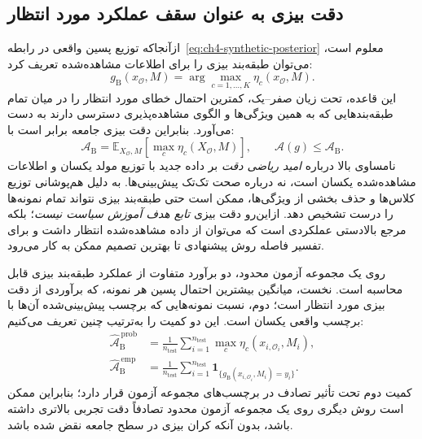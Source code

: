 \subsection{دقت بیزی به عنوان سقف عملکرد مورد انتظار}
\label{subsec:ch4-bayes-ceiling}
ازآنجاکه توزیع پسین واقعی در رابطه~\eqref{eq:ch4-synthetic-posterior} معلوم است، می‌توان طبقه‌بند بیزی را برای اطلاعات مشاهده‌شده تعریف کرد:
\begin{equation}\label{eq:ch4-bayes-rule}
g_{\mathrm B}(x_{\mathcal O},M)
=\arg\max_{c=1,\ldots,K}\eta_c(x_{\mathcal O},M).
\end{equation}
این قاعده، تحت زیان صفر--یک، کمترین احتمال خطای مورد انتظار را در میان تمام طبقه‌بندهایی که به همین ویژگی‌ها و الگوی مشاهده‌پذیری دسترسی دارند به دست می‌آورد. بنابراین دقت بیزی جامعه برابر است با:
\begin{equation}\label{eq:ch4-bayes-accuracy}
\boxed{
\mathcal A_{\mathrm B}
=\mathbb E_{X_{\mathcal O},M}
\left[\max_{c}\eta_c(X_{\mathcal O},M)\right],
\qquad
\mathcal A(g)\le\mathcal A_{\mathrm B}.
}
\end{equation}
نامساوی بالا درباره \emph{امید ریاضی دقت} بر داده جدید با توزیع مولد یکسان و اطلاعات مشاهده‌شده یکسان است، نه درباره صحت تک‌تک پیش‌بینی‌ها. به دلیل هم‌پوشانی توزیع کلاس‌ها و حذف بخشی از ویژگی‌ها، ممکن است حتی طبقه‌بند بیزی نتواند تمام نمونه‌ها را درست تشخیص دهد. ازاین‌رو دقت بیزی \emph{تابع هدف آموزش سیاست نیست}؛ بلکه مرجع بالادستی عملکردی است که می‌توان از داده مشاهده‌شده انتظار داشت و برای تفسیر فاصله روش پیشنهادی تا بهترین تصمیم ممکن به کار می‌رود.

روی یک مجموعه آزمون محدود، دو برآورد متفاوت از عملکرد طبقه‌بند بیزی قابل محاسبه است. نخست، میانگین بیشترین احتمال پسین هر نمونه، که برآوردی از دقت بیزی مورد انتظار است؛ دوم، نسبت نمونه‌هایی که برچسب پیش‌بینی‌شده آن‌ها با برچسب واقعی یکسان است. این دو کمیت را به‌ترتیب چنین تعریف می‌کنیم:
\begin{equation}\label{eq:ch4-bayes-test-estimates}
\begin{aligned}
\widehat{\mathcal A}_{\mathrm B}^{\,\mathrm{prob}}
&=\frac{1}{n_{\mathrm{test}}}
\sum_{i=1}^{n_{\mathrm{test}}}
\max_c\eta_c(x_{i,\mathcal O_i},M_i),\\
\widehat{\mathcal A}_{\mathrm B}^{\,\mathrm{emp}}
&=\frac{1}{n_{\mathrm{test}}}
\sum_{i=1}^{n_{\mathrm{test}}}
\mathbf1_{\{g_{\mathrm B}(x_{i,\mathcal O_i},M_i)=y_i\}}.
\end{aligned}
\end{equation}
کمیت دوم تحت تأثیر تصادف در برچسب‌های مجموعه آزمون قرار دارد؛ بنابراین ممکن است روش دیگری روی یک مجموعه آزمون محدود تصادفاً دقت تجربی بالاتری داشته باشد، بدون آنکه کران بیزی در سطح جامعه نقض شده باشد.

